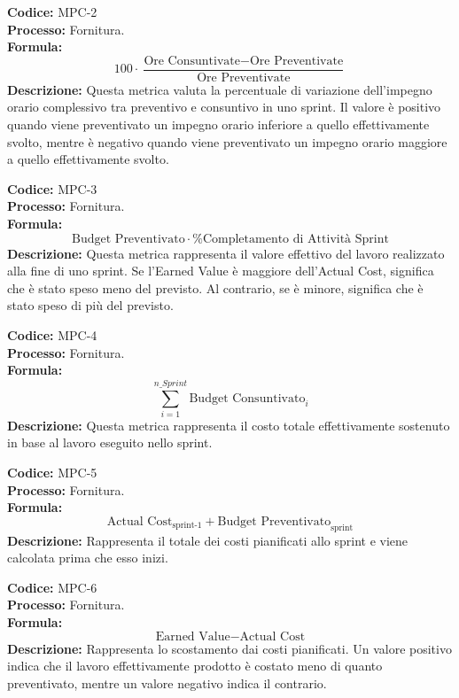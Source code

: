 \textbf{Codice:} MPC-2 \\
\textbf{Processo:} Fornitura. \\
\textbf{Formula:}
\[
100 \cdot \frac{\text{Ore Consuntivate} - \text{Ore Preventivate}}{\text{Ore Preventivate}}
\]
\textbf{Descrizione:} Questa metrica valuta la percentuale di variazione dell’impegno orario complessivo tra preventivo e consuntivo in uno sprint. Il valore è positivo quando viene preventivato un impegno orario inferiore a quello effettivamente svolto, mentre è negativo quando viene preventivato un impegno orario maggiore a quello effettivamente svolto.

\textbf{Codice:} MPC-3 \\
\textbf{Processo:} Fornitura. \\
\textbf{Formula:}
\[
\text{Budget Preventivato} \cdot \% \text{Completamento di Attività Sprint}
\]
\textbf{Descrizione:} Questa metrica rappresenta il valore effettivo del lavoro realizzato alla fine di uno sprint. Se l’Earned Value è maggiore dell’Actual Cost, significa che è stato speso meno del previsto. Al contrario, se è minore, significa che è stato speso di più del previsto.

\textbf{Codice:} MPC-4 \\
\textbf{Processo:} Fornitura. \\
\textbf{Formula:}
\[
\sum_{i=1}^{n\_Sprint} \text{Budget Consuntivato}_i
\]
\textbf{Descrizione:} Questa metrica rappresenta il costo totale effettivamente sostenuto in base al lavoro eseguito nello sprint.

\textbf{Codice:} MPC-5 \\
\textbf{Processo:} Fornitura. \\
\textbf{Formula:}
\[
\text{Actual Cost}_{\text{sprint-1}} + \text{Budget Preventivato}_{\text{sprint}}
\]
\textbf{Descrizione:} Rappresenta il totale dei costi pianificati allo sprint e viene calcolata prima che esso inizi.

\textbf{Codice:} MPC-6 \\
\textbf{Processo:} Fornitura. \\
\textbf{Formula:}
\[
\text{Earned Value} - \text{Actual Cost}
\]
\textbf{Descrizione:} Rappresenta lo scostamento dai costi pianificati. Un valore positivo indica che il lavoro effettivamente prodotto è costato meno di quanto preventivato, mentre un valore negativo indica il contrario.

